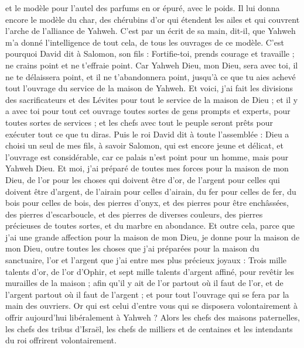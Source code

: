 \begin{multicols}{2}
et le modèle pour l'autel des parfums en or épuré, avec le poids. Il lui donna encore le modèle du char, des chérubins d’or qui étendent les ailes et qui couvrent l’arche de l'alliance de Yahweh.
C’est par un écrit de sa main, dit-il, que Yahweh m’a donné l'intelligence de tout cela, de tous les ouvrages de ce modèle.
C'est pourquoi David dit à Salomon, son fils : Fortifie-toi, prends courage et travaille ; ne crains point et ne t'effraie point. Car Yahweh Dieu, mon Dieu, sera avec toi, il ne te délaissera point, et il ne t'abandonnera point, jusqu'à ce que tu aies achevé tout l'ouvrage du service de la maison de Yahweh.
Et voici, j'ai fait les divisions des sacrificateurs et des Lévites pour tout le service de la maison de Dieu ; et il y a avec toi pour tout cet ouvrage toutes sortes de gens prompts et experts, pour toutes sortes de services ; et les chefs avec tout le peuple seront prêts pour exécuter tout ce que tu diras.
\VerseOne{}Puis le roi David dit à toute l'assemblée : Dieu a choisi un seul de mes fils, à savoir Salomon, qui est encore jeune et délicat, et l'ouvrage est considérable, car ce palais n'est point pour un homme, mais pour Yahweh Dieu.
Et moi, j'ai préparé de toutes mes forces pour la maison de mon Dieu, de l'or pour les choses qui doivent être d'or, de l'argent pour celles qui doivent être d'argent, de l'airain pour celles d'airain, du fer pour celles de fer, du bois pour celles de bois, des pierres d'onyx, et des pierres pour être enchâssées, des pierres d'escarboucle, et des pierres de diverses couleurs, des pierres précieuses de toutes sortes, et du marbre en abondance.
Et outre cela, parce que j'ai une grande affection pour la maison de mon Dieu, je donne pour la maison de mon Dieu, outre toutes les choses que j'ai préparées pour la maison du sanctuaire, l'or et l'argent que j'ai entre mes plus précieux joyaux :
Trois mille talents d'or, de l'or d'Ophir, et sept mille talents d'argent affiné, pour revêtir les murailles de la maison ;
afin qu'il y ait de l'or partout où il faut de l'or, et de l'argent partout où il faut de l'argent ; et pour tout l'ouvrage qui se fera par la main des ouvriers. Or qui est celui d'entre vous qui se disposera volontairement à offrir aujourd'hui libéralement à Yahweh ?
Alors les chefs des maisons paternelles, les chefs des tribus d'Israël, les chefs de milliers et de centaines et les intendants du roi offrirent volontairement.

\end{multicols}
